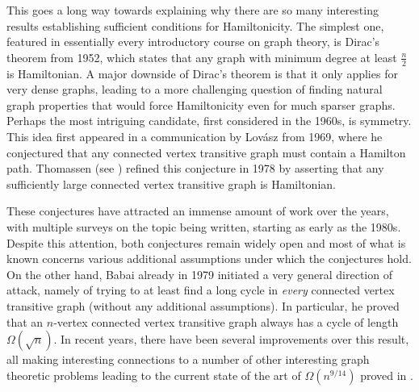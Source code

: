 \documentclass[english,11pt]{article}
\theoremstyle{definition}
\numberwithin{equation}{section}
\numberwithin{figure}{section}
\begin{document}
This goes a long way towards explaining why there are so many interesting results establishing sufficient conditions for Hamiltonicity. The simplest one, featured in essentially every introductory course on graph theory, is Dirac's theorem from 1952, which states that any graph with minimum degree at least $\frac{n}{2}$ is Hamiltonian. 
A major downside of Dirac's theorem is that it only applies for very dense graphs, leading to a more challenging question of finding natural graph properties that would force Hamiltonicity even for much sparser graphs. Perhaps the most intriguing
candidate, first considered in the 1960s, is symmetry. 
This idea first appeared in a communication by Lov\'asz \cite{lovasz1969} from 1969, where he conjectured that any connected vertex transitive graph must contain a Hamilton path. Thomassen (see \cite{babai}) refined this conjecture in 1978 by asserting that any sufficiently large connected vertex transitive graph is Hamiltonian. 

These conjectures have attracted an immense amount of work over the years, with multiple surveys on the topic \cite{cayley-survey-84,pak-radoicic-survey,alspach81,curran-gallian-survey} being written, starting as early as the 1980s. Despite this attention, both conjectures remain widely open and most of what is known concerns various additional assumptions under which the conjectures hold. On the other hand, Babai \cite{babai} already in 1979 initiated a very general direction of attack, namely of trying to at least find a long cycle in \emph{every} connected vertex transitive graph (without any additional assumptions). In particular, he proved that an $n$-vertex connected vertex transitive graph always has a cycle of length $\Omega(\sqrt{n})$. In recent years, there have been several improvements over this result, all making interesting connections to a number of other interesting graph theoretic problems \cite{yepremyan,norin2025small,devos,ma2025intersections} leading to the current state of the art of $\Omega(n^{9/14})$ proved in \cite{norin2025small}. 
\end{document}
